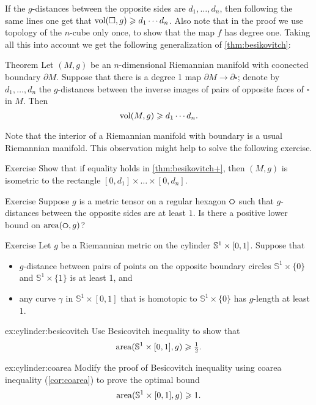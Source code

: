 If the $g$-distances between the opposite sides are $d_1,\dots ,d_n$, then following the same lines  one get that 
$\operatorname{\rm vol}\nolimits (\square,g)\geqslant d_1\cdots d_n$.
Also note that in the proof we use topology of the $n$-cube only once, to show that the map $f$ has degree one.
Taking all this into account we get the following generalization of \ref{thm:besikovitch}:

\begin{thm}{Theorem}\label{thm:besikovitch+}
Let $(M,g)$ be an $n$-dimensional Riemannian manifold with coonected boundary $\partial M$.
Suppose that there is a degree 1 map $\partial M\to \partial\square$;
denote by $d_1,\dots, d_n$ the $g$-distances between the inverse images of pairs of opposite faces of $\square$ in $M$.
Then 
\[\operatorname{\rm vol}\nolimits(M,g)\geqslant d_1\cdots d_n.\]

\end{thm}

Note that the interior of a Riemannian manifold with boundary is a usual Riemannian manifold.
This observation might help to solve the following exercise.

\begin{thm}{Exercise}\label{ex:besikovitch=}
Show that if equality holds in \ref{thm:besikovitch+},
then $(M,g)$ is isometric to the rectangle $[0,d_1]\times\dots\times[0, d_n]$.
\end{thm}



\begin{thm}{Exercise}\label{ex:hexagon}
Suppose $g$ is a metric tensor on a regular hexagon $\textbf{\hexagon}$ such that $g$-distances between the opposite sides are at least $1$.
Is there a positive lower bound on $\area(\textbf{\hexagon},g)$?
\end{thm}

\begin{thm}{Exercise}\label{ex:cylinder}
Let $g$ be a Riemannian metric on the cylinder $\mathbb{S}^1\z\times [0,1]$.
Suppose that 
\begin{itemize}
\item 
$g$-distance between pairs of points on the opposite boundary circles $\mathbb{S}^1\times\{0\}$ and $\mathbb{S}^1\times\{1\}$ is at least 1, and 
\item
any curve $\gamma$ in $\mathbb{S}^1\times [0,1]$ that is homotopic to $\mathbb{S}^1\times\{0\}$ has $g$-length at least $1$.
\end{itemize}

\begin{subthm}{ex:cylinder:besicovitch}
Use Besicovitch inequality to show that
\[\operatorname{\rm area}\nolimits(\mathbb{S}^1\times [0,1],g)\geqslant \tfrac12.\]

\end{subthm}

\begin{subthm}{ex:cylinder:coarea}
Modify the proof of Besicovitch inequality using coarea inequality (\ref{cor:coarea}) to prove the optimal bound  
\[\operatorname{\rm area}\nolimits(\mathbb{S}^1\times [0,1],g)\geqslant 1.\]
 
\end{subthm}

\end{thm}

